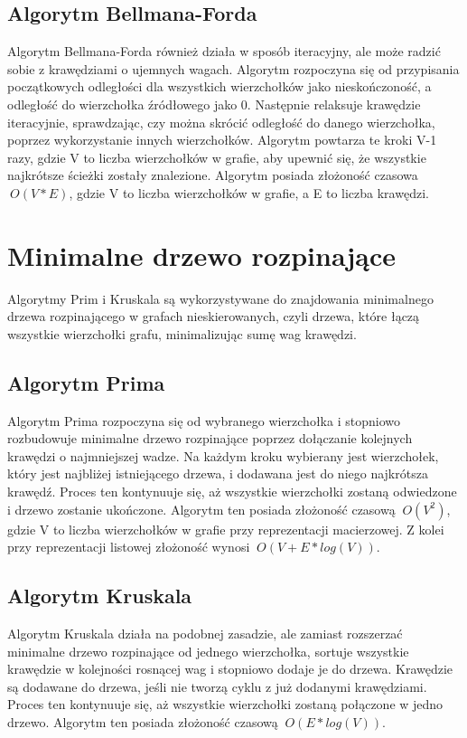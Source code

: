 \documentclass[11pt]{article}
\begin{document}
\subsection{Algorytm Bellmana-Forda}
Algorytm Bellmana-Forda również działa w sposób iteracyjny, ale może radzić sobie z krawędziami o ujemnych wagach.
Algorytm rozpoczyna się od przypisania początkowych odległości dla wszystkich wierzchołków jako nieskończoność, a odległość do wierzchołka źródłowego jako 0.
Następnie relaksuje krawędzie iteracyjnie, sprawdzając, czy można skrócić odległość do danego wierzchołka, poprzez wykorzystanie innych wierzchołków.
Algorytm powtarza te kroki V-1 razy, gdzie V to liczba wierzchołków w grafie, aby upewnić się, że wszystkie najkrótsze ścieżki zostały znalezione.
Algorytm posiada złożoność czasowa $\ O(V * E) $, gdzie V to liczba wierzchołków w grafie, a E to liczba krawędzi.

\section{Minimalne drzewo rozpinające}
Algorytmy Prim i Kruskala są wykorzystywane do znajdowania minimalnego drzewa rozpinającego w grafach nieskierowanych, czyli drzewa, które łączą wszystkie wierzchołki grafu, minimalizując sumę wag krawędzi.
\subsection{Algorytm Prima}
Algorytm Prima rozpoczyna się od wybranego wierzchołka i stopniowo rozbudowuje minimalne drzewo rozpinające poprzez dołączanie kolejnych krawędzi o najmniejszej wadze.
Na każdym kroku wybierany jest wierzchołek, który jest najbliżej istniejącego drzewa, i dodawana jest do niego najkrótsza krawędź.
Proces ten kontynuuje się, aż wszystkie wierzchołki zostaną odwiedzone i drzewo zostanie ukończone.
Algorytm ten posiada złożoność czasową $\ O(V^2) $, gdzie V to liczba wierzchołków w grafie przy reprezentacji macierzowej. Z kolei przy reprezentacji listowej złożoność wynosi $\ O(V + E * log(V)) $.
\subsection{Algorytm Kruskala}
Algorytm Kruskala działa na podobnej zasadzie, ale zamiast rozszerzać minimalne drzewo rozpinające od jednego wierzchołka, sortuje wszystkie krawędzie w kolejności rosnącej wag i stopniowo dodaje je do drzewa.
Krawędzie są dodawane do drzewa, jeśli nie tworzą cyklu z już dodanymi krawędziami.
Proces ten kontynuuje się, aż wszystkie wierzchołki zostaną połączone w jedno drzewo.
Algorytm ten posiada złożoność czasową $\ O(E * log(V)) $.
\end{document}
